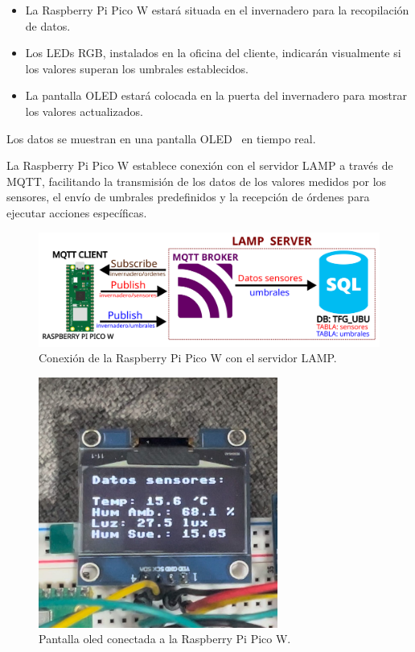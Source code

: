 \begin{itemize}
	\item La Raspberry Pi Pico W estará situada en el invernadero para la recopilación de datos.
	\item Los LEDs RGB, instalados en la oficina del cliente, indicarán visualmente si los valores superan los umbrales establecidos.
	\item La pantalla OLED estará colocada en la puerta del invernadero para mostrar los valores actualizados.
\end{itemize}

Los datos se muestran en una pantalla OLED~\cite{manual:Oled} en tiempo real.

La Raspberry Pi Pico W establece conexión con el servidor LAMP a través de MQTT, facilitando la transmisión de los datos de los valores medidos por los sensores, el envío de umbrales predefinidos y la recepción de órdenes para ejecutar acciones específicas.


\begin{figure}[h]
	\centering
	\includegraphics[width=1\textwidth]{img/diagramas/mqtt_hardware.png}
	\caption{Conexión de la Raspberry Pi Pico W con el servidor LAMP.} \label{Img:mqtt_hardware}
\end{figure}

\begin{figure}[h]
	\centering
	\includegraphics[width=0.7\textwidth]{img/fotos/oled1.png}
	\caption{Pantalla oled conectada a la Raspberry Pi Pico W.} \label{Img:oled_conexion}
\end{figure}

